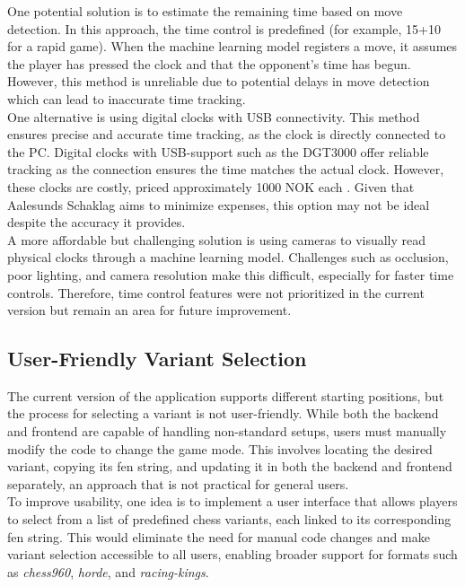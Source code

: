 One potential solution is to estimate the remaining time based on move detection. In this approach, the time control is predefined (for example, 15+10 for a rapid game). When the machine learning model registers a move, it assumes the player has pressed the clock and that the opponent’s time has begun. However, this method is unreliable due to potential delays in move detection which can lead to inaccurate time tracking. \\

One alternative is using digital clocks with USB connectivity. This method ensures precise and accurate time tracking, as the clock is directly connected to the PC. Digital clocks with USB-support such as the DGT3000 offer reliable tracking as the connection ensures the time matches the actual clock. However, these clocks are costly, priced approximately 1000 NOK each \cite{sjakkbutikken:dgt-clock}. Given that Aalesunds Schaklag aims to minimize expenses, this option may not be ideal despite the accuracy it provides. \\

A more affordable but challenging solution is using cameras to visually read physical clocks through a machine learning model. Challenges such as occlusion, poor lighting, and camera resolution make this difficult, especially for faster time controls. Therefore, time control features were not prioritized in the current version but remain an area for future improvement.


\subsection{User-Friendly Variant Selection}
The current version of the application supports different starting positions, but the process for selecting a variant is not user-friendly. While both the backend and frontend are capable of handling non-standard setups, users must manually modify the code to change the game mode. This involves locating the desired variant, copying its \gls{fen} string, and updating it in both the backend and frontend separately, an approach that is not practical for general users. \\

To improve usability, one idea is to implement a user interface that allows players to select from a list of predefined chess variants, each linked to its corresponding \gls{fen} string. This would eliminate the need for manual code changes and make variant selection accessible to all users, enabling broader support for formats such as \textit{\gls{chess960}}, \textit{\gls{horde}}, and \textit{\gls{racing-kings}}.

